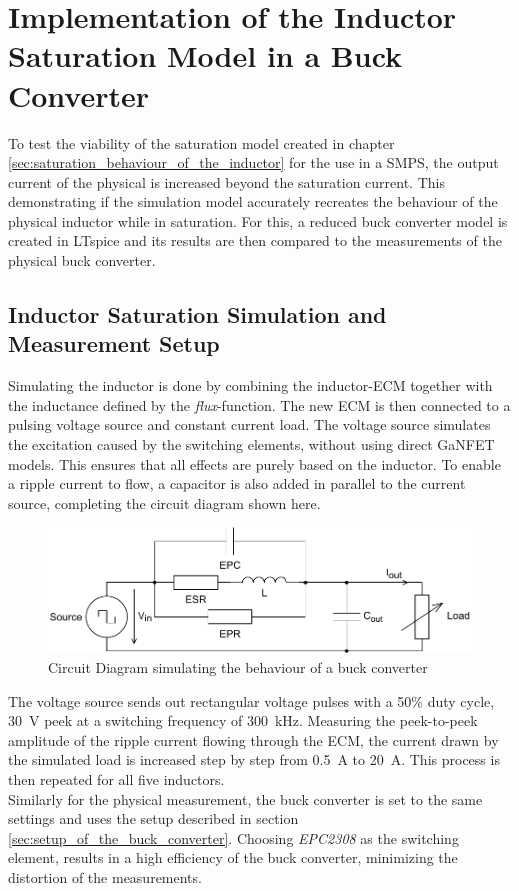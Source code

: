 \section{Implementation of the Inductor Saturation Model in a Buck Converter}\label{sec:validation_of_the_inductor_saturation_model}
To test the viability of the saturation model created in chapter \ref{sec:saturation_behaviour_of_the_inductor} for the use in a \ac{SMPS}, the output current of the physical is increased beyond the saturation current. This  demonstrating if the simulation model accurately recreates the behaviour of the physical inductor while in saturation.
For this, a reduced buck converter model is created in LTspice and its results are then compared to the measurements of the physical buck converter.
\subsection{Inductor Saturation Simulation and Measurement Setup}
Simulating the inductor is done by combining the inductor-\ac{ECM} together with the inductance defined by the \textit{flux}-function. The new \ac{ECM} is then connected to a pulsing voltage source and constant current load. The voltage source simulates the excitation caused by the switching elements, without using direct \ac{GaNFET} models. This ensures that all effects are purely based on the inductor. To enable a ripple current to flow, a capacitor is also added in parallel to the current source, completing the circuit diagram shown here.
\begin{figure}[H]
    \centering
    \includegraphics[width=1\linewidth]{Bilder/Kapitel4/Saturation_Validation_ECM.pdf}
    \caption{Circuit Diagram simulating the behaviour of a buck converter}
    \label{fig:saturation_validation_circuit_diagramm}
\end{figure}
The voltage source sends out rectangular voltage pulses with a 50\% duty cycle, \SI{30}{\V} peek at a switching frequency of \SI{300}{\kilo\Hz}. Measuring the peek-to-peek amplitude of the ripple current flowing through the \ac{ECM}, the current drawn by the simulated load is increased step by step from \SI{0.5}{\A} to \SI{20}{\A}. This process is then repeated for all five inductors.\\
Similarly for the physical measurement, the buck converter is set to the same settings and uses the setup described in section \ref{sec:setup_of_the_buck_converter}. Choosing \textit{EPC2308} as the switching element, results in a high efficiency of the buck converter, minimizing the distortion of the measurements. 
